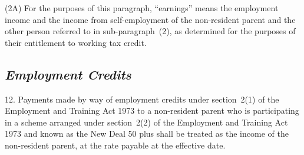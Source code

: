 \documentclass[12pt,a4paper]{article}
\begin{document}
(2A) For the purposes of this paragraph, “earnings” means the employment income and the income from self-employment of the non-resident parent and the other person referred to in sub-paragraph~(2), as determined for the purposes of their entitlement to working tax credit.

%


\subsection*{\itshape Employment Credits}

12.  Payments made by way of employment credits under section~2(1) of the Employment and Training Act 1973 to a non-resident parent who is participating in a scheme arranged under section~2(2) of the Employment and Training Act 1973 and known as the New Deal 50 plus shall be treated as the income of the non-resident parent, at the rate payable at the effective date.

\end{document}
